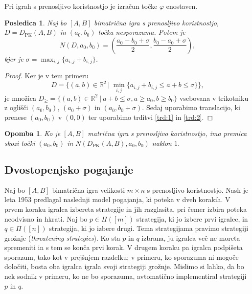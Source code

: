\documentclass[10pt, a4paper]{article}
\newtheorem{posledica}[izr]{Posledica}
\newtheorem*{opomba}{Opomba}
\newenvironment{noticeC}{%
  \tcolorbox[%
  notitle,
  empty,
  enhanced,  %
  breakable,
  coltext=black, 
  fontupper=\rmfamily,
  noparskip,
  sharp corners,
  boxrule=-1pt,  %
  frame hidden,
  left=7pt,  %
  right=7pt,
  top=5pt,
  bottom=5pt,
  before skip=2.5ex plus 2pt,
  after skip=2.5ex plus 2pt,
  overlay unbroken and last={%
  },
  ]}
{\endtcolorbox}
\newenvironment{dokaz}%
  {\begin{noticeC}\begin{proof}}%
  {\end{proof}\end{noticeC}}
\newcommand{\R}{\mathbb {R}}
\begin{document}
Pri igrah s prenosljivo koristnostjo je izračun točke $\varphi$ enostaven.

\begin{posledica}\label{pos:2}
  Naj bo $[A, B]$ bimatrična igra s prenosljivo koristnostjo, $D = D_{\mathrm{PK}} (A, B)$
  in $(a_0, b_0)$ točka nesporazuma. Potem je 
  $$N(D, a_0, b_0) = \left(\frac{a_0 - b_0 + \sigma}{2}, \frac{b_0 - a_0 + \sigma}{2}\right),$$
  kjer je $\sigma = \max_{i, j} \{a_{i, j} + b_{i, j}\}$.
\end{posledica}

\begin{dokaz}
  Ker je v tem primeru 
  $$D = \{(a, b) \in \R^2\ |\ \min_{i, j} \{a_{i, j} + b_{i, j} \leq a + b \leq \sigma\}\},$$
  je množica $D_\geq = \{(a, b) \in \R^2\ |\ a + b \leq \sigma, a \geq a_0, b\geq b_0\}$
  vsebovana v trikotniku z oglišči $(a_0, b_0)$, $(a_0 + \sigma)$ in $(a_0, b_0 + \sigma)$.
  Sedaj uporabimo translacijo, ki prenese $(a_0, b_0)$ v $(0, 0)$ ter uporabimo trditvi \ref{trd:1} in \ref{trd:2}.
\end{dokaz}

\begin{opomba}
  Ko je $[A, B]$ matrična igra s prenosljivo koristnostjo, ima premica skozi 
  točki $(a_0, b_0)$ in $N(D_{\mathrm{PK}} (A, B), a_0, b_0)$ naklon $1$.
\end{opomba}

\subsection{Dvostopenjsko pogajanje}

Naj bo $[A, B]$ bimatrična igra velikosti $m \times n$ s prenosljivo koristnostjo.
Nash je leta 1953 predlagal naslednji model pogajanja, ki poteka v dveh korakih.
V prvem koraku igralca izbereta strategije in jih razglasita, pri čemer izbira poteka neodvisno in hkrati.
Naj bo $p \in \Pi([m])$ strategija, ki jo izbere prvi igralec,
in $q \in \Pi([n])$ strategija, ki jo izbere drugi. Tema strategijama pravimo 
strategiji grožnje (\emph{threatening strategies}). Ko sta $p$ in $q$ izbrana,
ju igralca več ne moreta spremeniti in s tem se konča prvi korak.
V drugem koraku pa igralca podpišeta sporazum, tako kot v prejšnjem razdelku;
v primeru, ko sporazuma ni mogoče določiti, bosta oba igralca igrala svoji strategiji grožnje.
Mislimo si lahko, da bo nek sodnik v primeru, ko ne bo sporazuma, avtomatično implementiral
strategiji $p$ in $q$.
\end{document}
